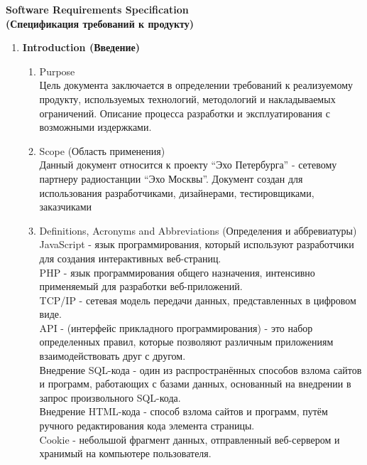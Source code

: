 \thispagestyle{empty}
\BgThispage
\begin{center}
    \LARGE
    \textbf{Software Requirements Specification \\
    (Спецификация требований к продукту)} \\
    \normalsize
\end{center}

\begin{enumerate}
    \item \textbf{Introduction (Введение)}
\begin{enumerate}[label=1.\arabic*]
        \item Purpose \\
        Цель документа заключается в определении требований к реализуемому продукту, используемых технологий,
        методологий и накладываемых ограничений. Описание процесса разработки и эксплуатирования с возможными издержками.
        \item Scope (Область применения) \\
        Данный документ относится к проекту ``Эхо Петербурга'' - сетевому партнеру радиостанции ``Эхо Москвы''. Документ
        создан для использования разработчиками, дизайнерами, тестировщиками, заказчиками
        \item Definitions, Acronyms and Abbreviations (Определения и аббревиатуры) \\
        JavaScript - язык программирования, который используют разработчики для создания интерактивных веб-страниц. \\
        PHP - язык программирования общего назначения, интенсивно применяемый для разработки веб-приложений. \\
        TCP/IP - сетевая модель передачи данных, представленных в цифровом виде. \\
        API - (интерфейс прикладного программирования) - это набор определенных правил, которые позволяют различным приложениям взаимодействовать друг с другом. \\
        Внедрение SQL-кода - один из распространённых способов взлома сайтов и программ, работающих с базами данных, основанный на внедрении в запрос произвольного SQL-кода. \\
        Внедрение HTML-кода - способ взлома сайтов и программ, путём ручного редактирования кода элемента страницы. \\
        Cookie - небольшой фрагмент данных, отправленный веб-сервером и хранимый на компьютере пользователя.\\

\end{enumerate}
\end{enumerate}
